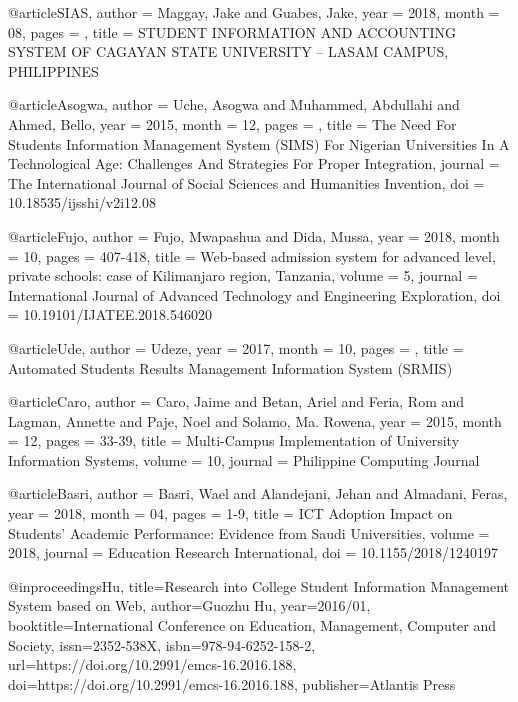 @article{SIAS,
    author = {Maggay, Jake and Guabes, Jake},
    year = {2018},
    month = {08},
    pages = {},
    title = {STUDENT INFORMATION AND ACCOUNTING SYSTEM OF CAGAYAN STATE UNIVERSITY – LASAM CAMPUS, PHILIPPINES}
}

@article{Asogwa,
    author = {Uche, Asogwa and Muhammed, Abdullahi and Ahmed, Bello},
    year = {2015},
    month = {12},
    pages = {},
    title = {The Need For Students Information Management System (SIMS) For Nigerian Universities In A Technological Age: Challenges And Strategies For Proper Integration},
    journal = {The International Journal of Social Sciences and Humanities Invention},
    doi = {10.18535/ijsshi/v2i12.08}
}

@article{Fujo,
    author = {Fujo, Mwapashua and Dida, Mussa},
    year = {2018},
    month = {10},
    pages = {407-418},
    title = {Web-based admission system for advanced level, private schools: case of Kilimanjaro region, Tanzania},
    volume = {5},
    journal = {International Journal of Advanced Technology and Engineering Exploration},
    doi = {10.19101/IJATEE.2018.546020}
}

@article{Ude,
    author = {Udeze},
    year = {2017},
    month = {10},
    pages = {},
    title = {Automated Students Results Management Information System (SRMIS)}
}

@article{Caro,
    author = {Caro, Jaime and Betan, Ariel and Feria, Rom and Lagman, Annette and Paje, Noel and Solamo, Ma. Rowena},
    year = {2015},
    month = {12},
    pages = {33-39},
    title = {Multi-Campus Implementation of University Information Systems},
    volume = {10},
    journal = {Philippine Computing Journal}
}

@article{Basri,
    author = {Basri, Wael and Alandejani, Jehan and Almadani, Feras},
    year = {2018},
    month = {04},
    pages = {1-9},
    title = {ICT Adoption Impact on Students’ Academic Performance: Evidence from Saudi Universities},
    volume = {2018},
    journal = {Education Research International},
    doi = {10.1155/2018/1240197}
}

@inproceedings{Hu,
  title={Research into College Student Information Management System based on Web},
  author={Guozhu Hu},
  year={2016/01},
  booktitle={International Conference on Education, Management, Computer and Society},
  issn={2352-538X},
  isbn={978-94-6252-158-2},
  url={https://doi.org/10.2991/emcs-16.2016.188},
  doi={https://doi.org/10.2991/emcs-16.2016.188},
  publisher={Atlantis Press}
}

